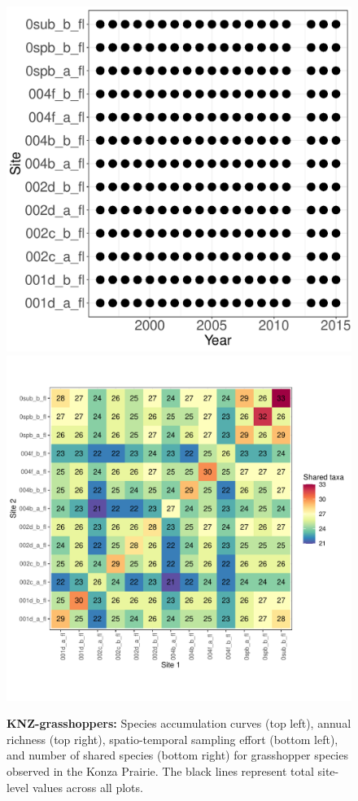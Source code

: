 \documentclass[11pt, oneside]{article}
\begin{document}
\begin{figure}[h!]
\includegraphics[scale = 0.4]{knz-grasshopper-compagnoni_spatiotemporal_sampling_effort.pdf}
\includegraphics[scale = 0.4]{knz-grasshopper-compagnoni_spp_shared.pdf}
\caption{{\bf KNZ-grasshoppers:} Species accumulation curves (top left),  annual richness (top right), spatio-temporal sampling effort (bottom left), and number of shared species (bottom right) for grasshopper species observed in the Konza Prairie. The black lines represent total site-level values across all plots.}
\label{knz-grasshoppers}
\end{figure}
\end{document}

